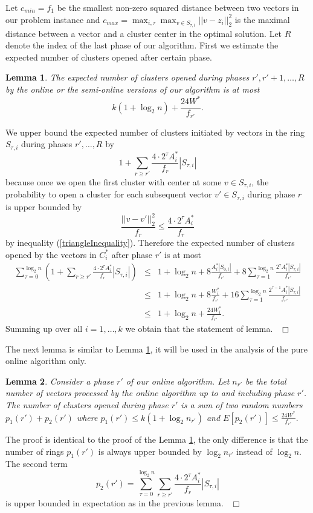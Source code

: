 \documentclass[11pt,twoside]{article}
\newtheorem{lemma}{Lemma}
\newenvironment{proof}{\medskip\noindent {\bf Proof.}}{~\hfill$\Box$\medskip}
\begin{document}
Let $c_{min}=f_1$ be the smallest non-zero squared distance between two vectors in our problem instance  and $c_{max}=\max_{i,\tau}\max_{v\in S_{\tau,i}} ||v-z_i||^2_2$ is the maximal distance between a vector and a cluster center in the optimal solution. Let $R$ denote the index of the last phase of our algorithm.
First we estimate the expected number of clusters opened after certain phase.
\begin{lemma}\label{expected}
The expected number of clusters opened during phases $r',r'+1,\dots,R$  by the online or the semi-online versions of our algorithm is at most
$$k(1+\log_2n) +\frac{24W^*}{f_{r'}}.$$ 
\end{lemma}
\begin{proof}
We upper bound the expected number of clusters initiated by vectors in the ring $S_{\tau,i}$ during phases $r',\dots,R$ by 
$$1+\sum_{r\ge r'}\frac{4\cdot 2^{\tau}A^*_i}{f_r}|S_{\tau,i}|$$
because once we open the first cluster with center at some   $v\in S_{\tau,i}$, the probability to open a cluster for each subsequent vector  $v'\in S_{\tau,i}$ during phase $r$ is upper bounded by 
$$\frac{||v-v'||^2_2}{f_r}\le \frac{4\cdot 2^{\tau}A^*_i}{f_r}$$
 by inequality (\ref{triangleInequality}).
Therefore the expected number of clusters opened by the vectors in $C^*_i$ after phase $r'$ is at most
\begin{eqnarray*}
\sum_{\tau=0}^{\log_2 n}\left(1+\sum_{r\ge r'}\frac{4\cdot 2^{\tau} A^*_i}{f_r}|S_{\tau,i}|\right)&\le &1+\log_2 n+8\frac{A^*_i|S_{0,i}|}{f_{r'}}+8\sum_{\tau=1}^{\log_2 n} \frac{2^{\tau}A^*_i|S_{\tau,i}|}{f_{r'}}\\
&\le &1+\log_2 n+8\frac{W^*_i}{f_{r'}}+16\sum_{\tau=1}^{\log_2 n} \frac{2^{\tau-1}A^*_i|S_{\tau,i}|}{f_{r'}}\\
&\le&1+ \log_2 n +\frac{24W^*_i}{f_{r'}}.
\end{eqnarray*}
Summing up over all $i=1,\dots, k$ we obtain that the statement of lemma.
\end{proof}

The next lemma is similar to Lemma \ref{expected}, it will be used in the analysis of the pure online algorithm only.
\begin{lemma}\label{expected1}
Consider a phase $r'$ of our online algorithm. Let $n_{r'}$ be the total number of vectors processed by the online algorithm up to and including phase $r'$. The  number of clusters opened during phase $r'$ is a sum of two random numbers $p_1(r')+p_2(r')$ where $p_1(r')\le k(1+\log_2n_{r'})$ and $E[p_2(r')]\le \frac{24W^*}{f_{r'}}.$
\end{lemma}
\begin{proof}
The proof is identical to the proof of the Lemma \ref{expected}, the only difference is that the number of rings $p_1(r')$ is always upper bounded by $ \log_2n_{r'}$ instead of $\log_2n$. The second term 
$$p_2(r')= \sum_{\tau=0}^{\log_2 n}\sum_{r\ge r'}\frac{4\cdot 2^{\tau} A^*_i}{f_r}|S_{\tau,i}|$$
 is upper bounded in expectation as in the previous lemma.
\end{proof}
\end{document}
